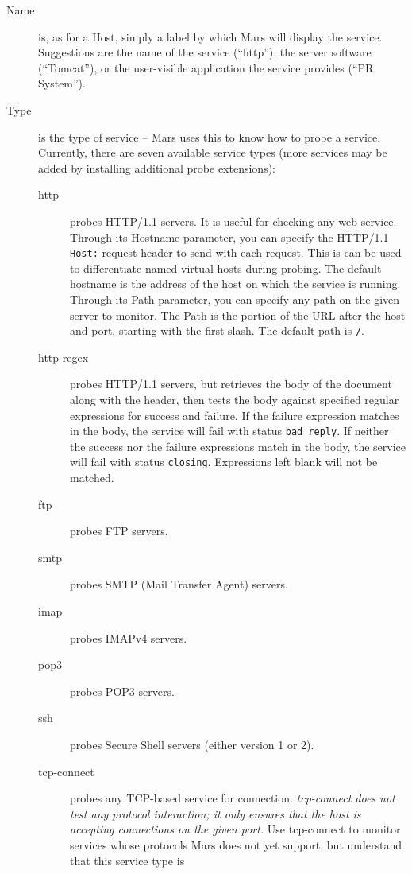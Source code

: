 \documentclass{article}
\newcommand{\filename}[1]{{\tt #1}}
\newcommand{\identifier}[1]{{\tt #1}}
\newcommand{\guiitem}[1]{{\sf #1}}
\begin{document}
\begin{description}
\item[Name] is, as for a Host, simply a label by which Mars will
  display the service. Suggestions are the name of the service
  (``http''), the server software (``Tomcat''), or the user-visible
  application the service provides (``PR System'').
\item[Type] is the type of service -- Mars uses this to know how to
  probe a service. Currently, there are seven available service types
  (more services may be added by installing additional probe
  extensions):
\begin{description}
\item[http] probes HTTP/1.1 servers. It is useful for checking any web
  service.  Through its \guiitem{Hostname} parameter, you can specify
  the HTTP/1.1 \identifier{Host:} request header to send with each
  request. This is can be used to differentiate named virtual hosts
  during probing. The default hostname is the address of the host on
  which the service is running.  Through its \guiitem{Path} parameter,
  you can specify any path on the given server to monitor. The
  \guiitem{Path} is the portion of the URL after the host
  and port, starting with the first slash. The default path is
  \filename{/}.
\item[http-regex] probes HTTP/1.1 servers, but retrieves the body of
  the document along with the header, then tests the body against
  specified regular expressions for success and failure. If the
  failure expression matches in the body, the service will fail with
  status \identifier{bad reply}. If neither the success nor the
  failure expressions match in the body, the service will fail with
  status \identifier{closing}. Expressions left blank will not be
  matched.
\item[ftp] probes FTP servers.
\item[smtp] probes SMTP (Mail Transfer Agent) servers.
\item[imap] probes IMAPv4 servers.
\item[pop3] probes POP3 servers.
\item[ssh] probes Secure Shell servers (either version 1 or 2).
\item[tcp-connect] probes any TCP-based service for connection. {\em
  \guiitem{tcp-connect} does not test any protocol interaction; it
  only ensures that the host is accepting connections on the given
  port.} Use \guiitem{tcp-connect} to monitor services whose protocols
  Mars does not yet support, but understand that this service type is

\end{description}
\end{description}
\end{document}
